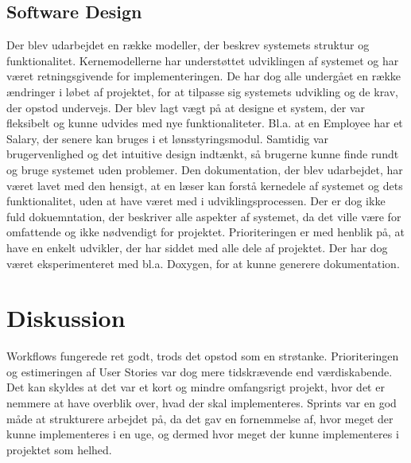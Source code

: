\subsection{Software Design}
Der blev udarbejdet en række modeller, der beskrev systemets struktur og funktionalitet. Kernemodellerne har understøttet udviklingen af systemet og har været retningsgivende for implementeringen.
De har dog alle undergået en række ændringer i løbet af projektet, for at tilpasse sig systemets udvikling og de krav, der opstod undervejs.
Der blev lagt vægt på at designe et system, der var fleksibelt og kunne udvides med nye funktionaliteter. Bl.a. at en Employee har et Salary, der senere kan bruges i et lønsstyringsmodul.
Samtidig var brugervenlighed og det intuitive design indtænkt, så brugerne kunne finde rundt og bruge systemet uden problemer.
Den dokumentation, der blev udarbejdet, har været lavet med den hensigt, at en læser kan forstå kernedele af systemet og dets funktionalitet, uden at have været med i udviklingsprocessen.
Der er dog ikke fuld dokuemntation, der beskriver alle aspekter af systemet, da det ville være for omfattende og ikke nødvendigt for projektet.
Prioriteringen er med henblik på, at have en enkelt udvikler, der har siddet med alle dele af projektet.
Der har dog været eksperimenteret med bl.a. Doxygen, for at kunne generere dokumentation.


\section{Diskussion}
\label{sec:conclusion_discussion}
Workflows fungerede ret godt, trods det opstod som en strøtanke. Prioriteringen og estimeringen af User Stories var dog mere tidskrævende end værdiskabende. 
Det kan skyldes at det var et kort og mindre omfangsrigt projekt, hvor det er nemmere at have overblik over, hvad der skal implementeres.
Sprints var en god måde at strukturere arbejdet på, da det gav en fornemmelse af, hvor meget der kunne implementeres i en uge, og dermed hvor meget der kunne implementeres i projektet som helhed.

